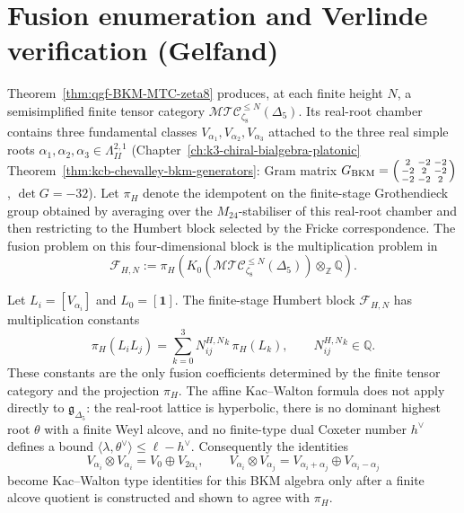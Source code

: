 \section{Fusion enumeration and Verlinde verification (Gelfand)}
\label{sec:qgf-fusion-verlinde}

Theorem~\ref{thm:qgf-BKM-MTC-zeta8} produces, at each finite height
\(N\), a semisimplified finite tensor category
\(\mathcal{MTC}_{\zeta_8}^{\leq N}(\Delta_5)\). Its real-root chamber
contains three fundamental classes
\(V_{\alpha_1}, V_{\alpha_2}, V_{\alpha_3}\) attached to the three real
simple roots \(\alpha_1,\alpha_2,\alpha_3\in\Lambda^{2,1}_{II}\)
(Chapter~\ref{ch:k3-chiral-bialgebra-platonic}
Theorem~\ref{thm:kcb-chevalley-bkm-generators}: Gram matrix
$G_{\mathrm{BKM}} = \begin{psmallmatrix}2 & -2 & -2\\ -2 & 2 & -2\\ -2 & -2 & 2\end{psmallmatrix}$, $\det G = -32$).
Let \(\pi_H\) denote the idempotent on the finite-stage Grothendieck
group obtained by averaging over the \(M_{24}\)-stabiliser of this
real-root chamber and then restricting to the Humbert block selected by
the Fricke correspondence. The fusion problem on this four-dimensional
block is the multiplication problem in
\[
 \mathcal F_{H,N}
 :=
 \pi_H\!\left(K_0(\mathcal{MTC}_{\zeta_8}^{\leq N}(\Delta_5))
 \otimes_{\mathbb Z}\mathbb Q\right).
\]

\begin{theorem}[Projected real-root fusion block at \texorpdfstring{$\ell = 8$}{l = 8}]
\label{thm:qgf-fusion-matrix}
Let \(L_i=[V_{\alpha_i}]\) and \(L_0=[\mathbf1]\). The finite-stage
Humbert block \(\mathcal F_{H,N}\) has multiplication constants
\[
 \pi_H(L_iL_j)=\sum_{k=0}^3 N^{H,N}_{ij}{}^k\,\pi_H(L_k),
 \qquad
 N^{H,N}_{ij}{}^k\in\mathbb Q.
\]
These constants are the only fusion coefficients determined by the
finite tensor category and the projection \(\pi_H\). The affine
Kac--Walton formula does not apply directly to
\(\mathfrak g_{\Delta_5}\): the real-root lattice is hyperbolic,
there is no dominant highest root \(\theta\) with a finite Weyl alcove,
and no finite-type dual Coxeter number \(h^\vee\) defines a bound
\(\langle\lambda,\theta^\vee\rangle\leq \ell-h^\vee\).
Consequently the identities
\[
 V_{\alpha_i}\otimes V_{\alpha_i}=V_0\oplus V_{2\alpha_i},
 \qquad
 V_{\alpha_i}\otimes V_{\alpha_j}
 =V_{\alpha_i+\alpha_j}\oplus V_{\alpha_i-\alpha_j}
\]
become Kac--Walton type identities for this BKM algebra only after a
finite alcove quotient is constructed and shown to agree with \(\pi_H\).
\end{theorem}

